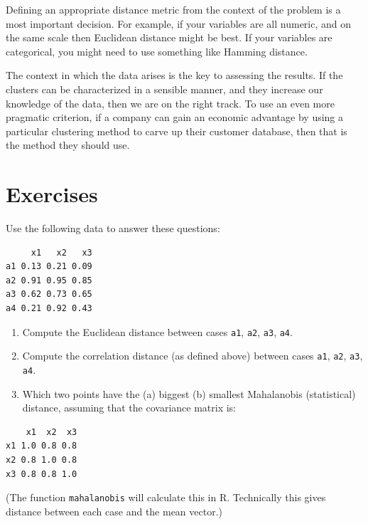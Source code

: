\documentclass[
  letterpaper,
]{krantz}
\begin{document}
Defining an appropriate distance metric from the context of the problem
is a most important decision. For example, if your variables are all
numeric, and on the same scale then Euclidean distance might be best. If
your variables are categorical, you might need to use something like
Hamming distance.

The context in which the data arises is the key to assessing the
results. If the clusters can be characterized in a sensible manner, and
they increase our knowledge of the data, then we are on the right track.
To use an even more pragmatic criterion, if a company can gain an
economic advantage by using a particular clustering method to carve up
their customer database, then that is the method they should use.

\hypertarget{exercises-5}{%
\section*{Exercises}\label{exercises-5}}


Use the following data to answer these questions:

\begin{verbatim}
     x1   x2   x3
a1 0.13 0.21 0.09
a2 0.91 0.95 0.85
a3 0.62 0.73 0.65
a4 0.21 0.92 0.43
\end{verbatim}

\begin{enumerate}
\def\labelenumi{\arabic{enumi}.}
\item
  Compute the Euclidean distance between cases \texttt{a1}, \texttt{a2},
  \texttt{a3}, \texttt{a4}.
\item
  Compute the correlation distance (as defined above) between cases
  \texttt{a1}, \texttt{a2}, \texttt{a3}, \texttt{a4}.
\item
  Which two points have the (a) biggest (b) smallest Mahalanobis
  (statistical) distance, assuming that the covariance matrix is:
\end{enumerate}

\begin{verbatim}
    x1  x2  x3
x1 1.0 0.8 0.8
x2 0.8 1.0 0.8
x3 0.8 0.8 1.0
\end{verbatim}

(The function \texttt{mahalanobis} will calculate this in R. Technically
this gives distance between each case and the mean vector.)
\end{document}
